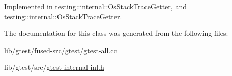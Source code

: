 Implemented in \hyperlink{classtesting_1_1internal_1_1_os_stack_trace_getter_abdfefeba8ffb0f1031491e4bd1a7fad9}{testing\-::internal\-::\-Os\-Stack\-Trace\-Getter}, and \hyperlink{classtesting_1_1internal_1_1_os_stack_trace_getter_af5ac172386d7454279c9e8fb6d756a61}{testing\-::internal\-::\-Os\-Stack\-Trace\-Getter}.



The documentation for this class was generated from the following files\-:\begin{DoxyCompactItemize}
\item 
lib/gtest/fused-\/src/gtest/\hyperlink{fused-src_2gtest_2gtest-all_8cc}{gtest-\/all.\-cc}\item 
lib/gtest/src/\hyperlink{gtest-internal-inl_8h}{gtest-\/internal-\/inl.\-h}\end{DoxyCompactItemize}
